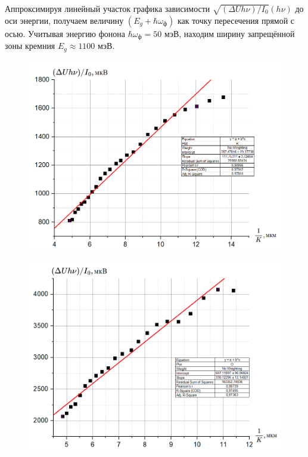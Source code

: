 \documentclass[a4paper, 12pt]{article}
\begin{document}
   

Аппроксимируя линейный участок графика зависимости $\sqrt{(\Delta Uh\nu)/I_0}(h\nu)$ до оси энергии, получаем величину $(E_g+\hbar\omega_{\text{ф}})$ как точку пересечения прямой с осью. Учитывая энергию фонона $\hbar\omega_{\text{ф}}=50$ мэВ, находим ширину запрещённой зоны кремния $E_g\approx1100$ мэВ.
\newpage
\begin{figure}[h!]
\begin{center}
\begin{minipage}[h!]{0.495\linewidth}
\includegraphics[width=1\linewidth]{img/l3.png}
\label{ris:experimoriginal} %
\end{minipage}
\hfill 
\begin{minipage}[h!]{0.495\linewidth}
\includegraphics[width=1\linewidth]{img/l6.png}


\end{minipage}
\end{center}
\end{figure}
\end{document}
